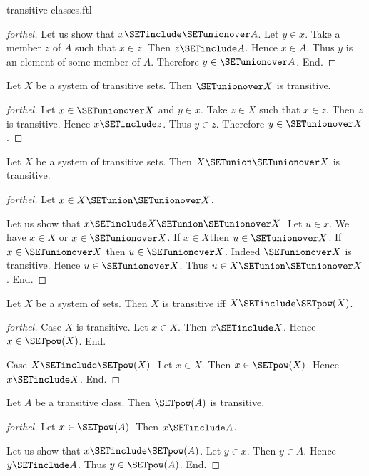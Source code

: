 \documentclass{naproche-library}
\begin{document}
\begin{smodule}[title=Transitive Classes]{transitive-classes.ftl}
\begin{proof}[forthel]
  Let us show that $x \SETinclude \SETunionover A$.
    Let $y \in x$.
    Take a member $z$ of $A$ such that $x \in z$.
    Then $z \SETinclude A$.
    Hence $x \in A$.
    Thus $y$ is an element of some member of $A$.
    Therefore $y \in \SETunionover A$.
  End.
\end{proof}

\begin{proposition}[forthel,id=SET_THEORY_01_6726468811882496]
  Let $X$ be a system of transitive sets.
  Then $\SETunionover X$ is transitive.
\end{proposition}
\begin{proof}[forthel]
  Let $x \in \SETunionover X$ and $y \in x$.
  Take $z \in X$ such that $x \in z$.
  Then $z$ is transitive.
  Hence $x \SETinclude z$.
  Thus $y \in z$.
  Therefore $y \in \SETunionover X$.
\end{proof}

\begin{proposition}[forthel,id=SET_THEORY_01_4884401668227072]
  Let $X$ be a system of transitive sets.
  Then $X \SETunion \SETunionover X$ is transitive.
\end{proposition}
\begin{proof}[forthel]
  Let $x \in X \SETunion \SETunionover X$.

  Let us show that $x \SETinclude X \SETunion \SETunionover X$.
    Let $u \in x$.
    We have $x \in X$ or $x \in \SETunionover X$.
    If $x \in X$then $u \in \SETunionover X$.
    If $x \in \SETunionover X$ then $u \in \SETunionover X$.
    Indeed $\SETunionover X$ is transitive.
    Hence $u \in \SETunionover X$.
    Thus $u \in X \SETunion \SETunionover X$.
  End.
\end{proof}

\begin{proposition}[forthel,id=SET_THEORY_01_1399002962591744]
  Let $X$ be a system of sets.
  Then $X$ is transitive iff $X \SETinclude \SETpow(X)$.
\end{proposition}
\begin{proof}[forthel]
  Case $X$ is transitive.
    Let $x \in X$.
    Then $x \SETinclude X$.
    Hence $x \in \SETpow(X)$.
  End.

  Case $X \SETinclude \SETpow(X)$.
    Let $x \in X$.
    Then $x \in \SETpow(X)$.
    Hence $x \SETinclude X$.
  End.
\end{proof}

\begin{proposition}[forthel,id=SET_THEORY_01_6995689103949824]
  Let $A$ be a transitive class.
  Then $\SETpow(A)$ is transitive.
\end{proposition}
\begin{proof}[forthel]
  Let $x \in \SETpow(A)$.
  Then $x \SETinclude A$.

  Let us show that $x \SETinclude \SETpow(A)$.
    Let $y \in x$.
    Then $y \in A$.
    Hence $y \SETinclude A$.
    Thus $y \in \SETpow(A)$.
  End.
\end{proof}
\end{smodule}
\end{document}
